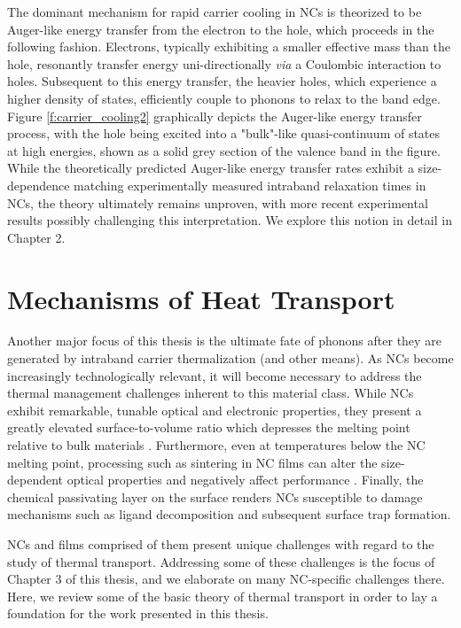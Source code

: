 The dominant mechanism for rapid carrier cooling in NCs is theorized to be Auger-like energy transfer from the electron to the hole, which proceeds in the following fashion. Electrons, typically exhibiting a smaller effective mass than the hole, resonantly transfer energy uni-directionally \emph{via} a Coulombic interaction to holes. Subsequent to this energy transfer, the heavier holes, which experience a higher density of states, efficiently couple to phonons to relax to the band edge. Figure \ref{f:carrier_cooling2} graphically depicts the Auger-like energy transfer process, with the hole being excited into a "bulk"-like quasi-continuum of states at high energies, shown as a solid grey section of the valence band in the figure. While the theoretically predicted Auger-like energy transfer rates exhibit a size-dependence matching experimentally measured intraband relaxation times in NCs, the theory ultimately remains unproven, with more recent experimental results possibly challenging this interpretation. We explore this notion in detail in Chapter 2.

\section{Mechanisms of Heat Transport}
Another major focus of this thesis is the ultimate fate of phonons after they are generated by intraband carrier thermalization (and other means). As NCs become increasingly technologically relevant, it will become necessary to address the thermal management challenges inherent to this material class. While NCs exhibit remarkable, tunable optical and electronic properties, they present a greatly elevated surface-to-volume ratio which depresses the melting point relative to bulk materials \cite{goldstein1992melting}. Furthermore, even at temperatures below the NC melting point, processing such as sintering in NC films can alter the size-dependent optical properties and negatively affect performance \cite{drndic2002transport}. Finally, the chemical passivating layer on the surface renders NCs susceptible to damage mechanisms such as ligand decomposition and subsequent surface trap formation. \par

NCs and films comprised of them present unique challenges with regard to the study of thermal transport. Addressing some of these challenges is the focus of Chapter 3 of this thesis, and we elaborate on many NC-specific challenges there. Here, we review some of the basic theory of thermal transport in order to lay a foundation for the work presented in this thesis.

